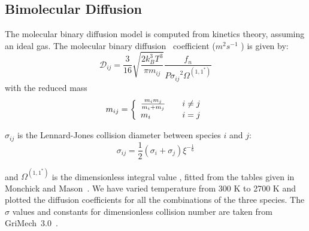 \subsection{Bimolecular Diffusion}
 The molecular binary diffusion model is
computed from kinetics theory, assuming an ideal gas. The molecular binary diffusion~\cite{Curtiss} coefficient ($m^2 s^{-1}$ ) is given by:
%
\begin{equation}
  \mathcal{D}_{ij} = \frac{3}{16}\sqrt{\frac{2 k_B^3 T^3}{\pi m_{ij}}}\frac{f_n}{{ P \sigma_{ij}}^2   \Omega^{(1,1^*)}}
\end{equation}
with  the reduced mass
\begin{equation}
m_{ij} = \left\{\begin{array}{l@{\qquad}l}
                \frac{m_i m_j}{m_i + m_j} &  i \neq j \\
                m_i                                  & i=j
                    \end{array}
              \right.
\end{equation}

$\sigma_{ij}$ is the Lennard-Jones collision diameter between species $i$ and $j$:
\begin{equation}
\sigma_{ij} = \frac{1}{2}\left(\sigma_i + \sigma_j\right) \xi^{-\frac{1}{6}}
\end{equation}

 and $\Omega^{(1,1^*)}$ is the dimensionless integral value ,
fitted from the tables given in Monchick and Mason~\cite{Monchick}. We
have varied temperature from 300 K to 2700 K and plotted the diffusion
coefficients for all the combinations of the three species.
The $\sigma$ values and constants for dimensionless collision number
are taken from GriMech~3.0~\cite{gri}.


